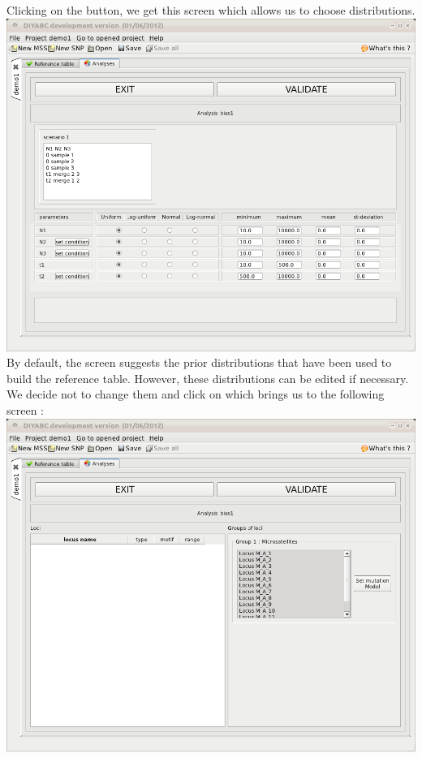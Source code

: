 Clicking on the  button, we get this screen which allows us to choose distributions. \\

\includegraphics[scale=0.35]{gui_pictures/Capture-DIYABC-46.png} \\

By default, the screen suggests the prior distributions that have been used to build the reference table. However, these distributions can be edited if necessary. We decide not to change them and click on  which brings us to the following screen :\\

\includegraphics[scale=0.35]{gui_pictures/Capture-DIYABC-47.png} \\

